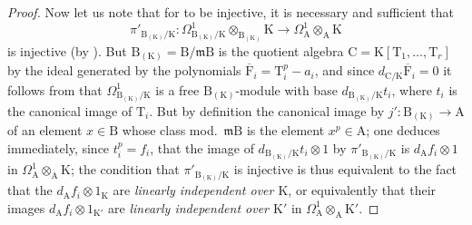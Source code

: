 \begin{proof}
Now let us note that for  to be injective, it is necessary and sufficient that
\[
  \pi'_{\mathrm{B}_{(\mathrm{K})}/\mathrm{K}}:\Omega^1_{\mathrm{B}_{(\mathrm{K})}/\mathrm{K}}\otimes_{\mathrm{B}_{(\mathrm{K})}}\mathrm{K}\to\Omega^1_\mathrm{A}\otimes_\mathrm{A}\mathrm{K}
\]
is injective (by ).
But $\mathrm{B}_{(\mathrm{K})}=\mathrm{B}/\mathfrak{m}\mathrm{B}$ is the quotient algebra $\mathrm{C}=\mathrm{K}[\mathrm{T}_1,\ldots,\mathrm{T}_r]$ by the ideal generated by the polynomials $\overline{\mathrm{F}}_i=\mathrm{T}_i^p-a_i$, and since $d_{\mathrm{C}/\mathrm{K}}\overline{\mathrm{F}}_i=0$ it follows from  that $\Omega^1_{\mathrm{B}_{(\mathrm{K})}/\mathrm{K}}$ is a free $\mathrm{B}_{(\mathrm{K})}$-module with base $d_{\mathrm{B}_{(\mathrm{K})}/\mathrm{K}}t_i$, where $t_i$ is the canonical image of $\mathrm{T}_i$.
But by definition  the canonical image by $j':\mathrm{B}_{(\mathrm{K})}\to\mathrm{A}$ of an element $x\in\mathrm{B}$ whose class mod.~$\mathfrak{m}\mathrm{B}$ is the element $x^p\in\mathrm{A}$; one deduces immediately, since $t_i^p=f_i$, that the image of $d_{\mathrm{B}_{(\mathrm{K})}/\mathrm{K}}t_i\otimes 1$ by $\pi'_{\mathrm{B}_{(\mathrm{K})}/\mathrm{K}}$ is $d_\mathrm{A}f_i\otimes 1$ in $\Omega^1_\mathrm{A}\otimes_\mathrm{A}\mathrm{K}$; the condition that $\pi'_{\mathrm{B}_{(\mathrm{K})}/\mathrm{K}}$ is injective is thus equivalent to the fact that the $d_\mathrm{A}f_i\otimes 1_\mathrm{K}$ are \emph{linearly independent over $\mathrm{K}$}, or equivalently that their images $d_\mathrm{A}f_i\otimes 1_{\mathrm{K}'}$ are \emph{linearly independent over $\mathrm{K}'$} in $\Omega^1_\mathrm{A}\otimes_\mathrm{A}\mathrm{K}'$.


\end{proof}
